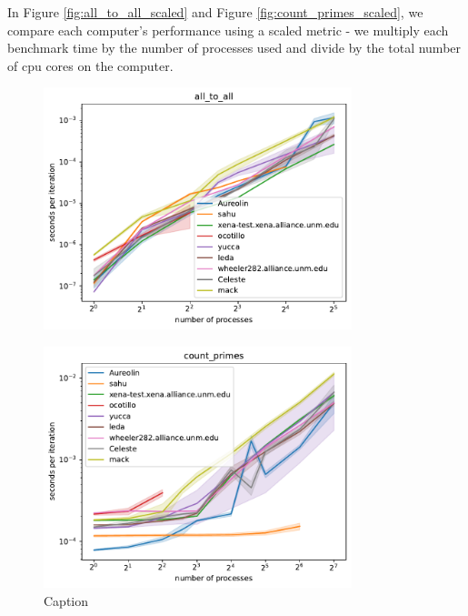 \documentclass{article}
\begin{document}
In Figure \ref{fig:all_to_all_scaled} and Figure \ref{fig:count_primes_scaled}, we compare each computer's performance using a scaled metric - we multiply each benchmark time by the number of processes used and divide by the total number of cpu cores on the computer. 

\begin{figure}[h]
    \centering
    \includegraphics[width=0.8\textwidth]{figures/draft/all_to_all.pdf}
    \caption{}
    \label{fig:all_to_all}
\end{figure}

\begin{figure}[h]
    \centering
    \includegraphics[width=0.8\textwidth]{figures/draft/count_primes.pdf}
    \caption{Caption}
    \label{fig:count_primes}
\end{figure}
\end{document}

